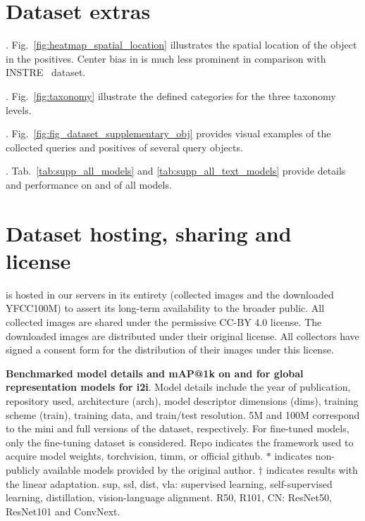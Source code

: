 \section{Dataset extras}

. 
Fig.~\ref{fig:heatmap_spatial_location} illustrates the spatial location of the object in the positives. Center bias in \ours is much less prominent in comparison with INSTRE~\cite{wj15} dataset. 

. Fig.~\ref{fig:taxonomy} illustrate the defined categories for the three taxonomy levels.

. Fig.~\ref{fig:fig_dataset_supplementary_obj} provides visual examples of the collected queries and positives of several query objects.

. Tab.~\ref{tab:supp_all_models} and \ref{tab:supp_all_text_models} provide details and performance on \ours and \miniours of all models.

\section{Dataset hosting, sharing and license}
\ours is hosted in our servers in its entirety (\ie collected images and the downloaded YFCC100M) to assert its long-term availability to the broader public. All collected images are shared under the permissive CC-BY 4.0 license. The downloaded images are distributed under their original license. All collectors have signed a consent form for the distribution of their images under this license.

\newpage

\begin{table*}[t]
  \centering
  \scalebox{0.67}{
    
  }
  \caption{\textbf{Benchmarked model details and mAP@1k on \ours and \miniours for global representation models for i2i}. Model details include the year of publication, repository used, architecture (arch), model descriptor dimensions (dims), training scheme (train), training data, and train/test resolution. 5M and 100M correspond to the mini and full versions of the dataset, respectively. For fine-tuned models, only the fine-tuning dataset is considered. Repo indicates the framework used to acquire model weights, \ie torchvision, timm, or official github. $*$ indicates non-publicly available models provided by the original author. $\dagger$ indicates results with the linear adaptation. sup, ssl, dist, vla: supervised learning, self-supervised learning, distillation, vision-language alignment. R50, R101, CN: ResNet50, ResNet101 and ConvNext.
  \label{tab:supp_all_models}
  }
\end{table*}


